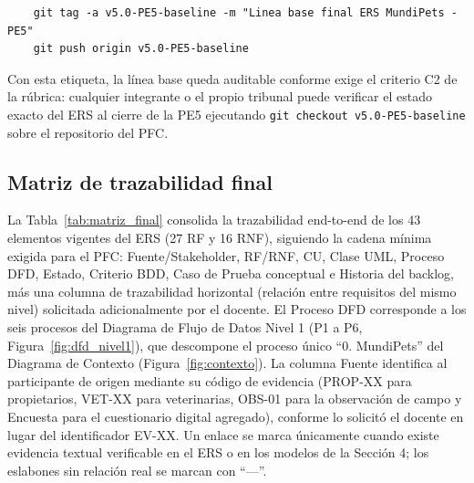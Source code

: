 \documentclass[journal,onecolumn]{IEEEtran}
\begin{document}
\begin{verbatim}
	git tag -a v5.0-PE5-baseline -m "Linea base final ERS MundiPets - PE5"
	git push origin v5.0-PE5-baseline
\end{verbatim}

\noindent Con esta etiqueta, la línea base queda auditable conforme
exige el criterio C2 de la rúbrica: cualquier integrante o el propio
tribunal puede verificar el estado exacto del ERS al cierre de la PE5
ejecutando \texttt{git checkout v5.0-PE5-baseline} sobre el repositorio
del PFC.

\subsection{Matriz de trazabilidad final}

La Tabla~\ref{tab:matriz_final} consolida la trazabilidad end-to-end de
los 43 elementos vigentes del ERS (27 RF y 16 RNF), siguiendo la cadena
mínima exigida para el PFC: Fuente/Stakeholder, RF/RNF, CU, Clase UML,
Proceso DFD, Estado, Criterio BDD, Caso de Prueba conceptual e Historia
del backlog, más una columna de trazabilidad horizontal (relación entre
requisitos del mismo nivel) solicitada adicionalmente por el docente. El
Proceso DFD corresponde a los seis procesos del Diagrama de Flujo de
Datos Nivel 1 (P1 a P6, Figura~\ref{fig:dfd_nivel1}), que descompone el
proceso único ``0. MundiPets'' del Diagrama de Contexto
(Figura~\ref{fig:contexto}). La columna Fuente identifica al
participante de origen mediante su código de evidencia (PROP-XX para
propietarios, VET-XX para veterinarias, OBS-01 para la observación de
campo y Encuesta para el cuestionario digital agregado), conforme lo
solicitó el docente en lugar del identificador EV-XX. Un enlace se marca
únicamente cuando existe evidencia textual verificable en el ERS o en
los modelos de la Sección 4; los eslabones sin relación real se marcan
con ``---''.
\end{document}
